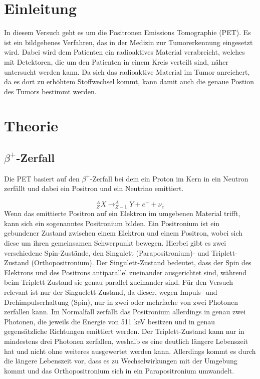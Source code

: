 \section{Einleitung}
In diesem Versuch geht es um die Positronen Emissions Tomographie (PET). Es ist ein bildgebenes Verfahren, das in der Medizin zur Tumorerkennung eingesetzt wird. Dabei wird dem Patienten ein radioaktives Material verabreicht, welches mit Detektoren, die um den Patienten in einem Kreis verteilt sind, näher untersucht werden kann. Da sich das radioaktive Material im Tumor anreichert, da es dort zu erhöhtem Stoffwechsel kommt, kann damit auch die genaue Postion des Tumors bestimmt werden.

\section{Theorie}
\subsection{$\beta^{+}$-Zerfall}
Die PET basiert auf den $\beta^{+}$-Zerfall bei dem ein Proton im Kern in ein Neutron zerfällt und dabei ein Positron und ein Neutrino emittiert.

\begin{equation}
	^{A}_{Z}X \rightarrow ^{A}_{Z-1}Y + e^{+} + \nu_{e}
\end{equation}
Wenn das emittierte Positron auf ein Elektron im umgebenen Material trifft, kann sich ein sogenanntes Positronium bilden. Ein Positronium ist ein gebundener Zustand zwischen einem Elektron und einem Positron, wobei sich diese um ihren gemeinsamen Schwerpunkt bewegen. Hierbei gibt es zwei verschiedene Spin-Zustände, den Singulett (Parapositronium)- und Triplett-Zustand (Orthopositronium). Der Singulett-Zustand bedeutet, dass der Spin des Elektrons und des Positrons antiparallel zueinander ausgerichtet sind, während beim Triplett-Zustand sie genau parallel zueinander sind. Für den Versuch relevant ist nur der Singuelett-Zustand, da dieser, wegen Impuls- und Drehimpulserhaltung (Spin), nur in zwei oder mehrfache von zwei Photonen zerfallen kann. Im Normalfall zerfällt das Positronium allerdings in genau zwei Photonen, die jeweils die Energie von 511 keV besitzen und in genau gegensätzliche Richtungen emittiert werden. Der Triplett-Zustand kann nur in mindestens drei Photonen zerfallen, weshalb es eine deutlich längere Lebenszeit hat und nicht ohne weiteres ausgewertet werden kann. Allerdings kommt es durch die längere Lebenszeit vor, dass es zu Wechselwirkungen mit der Umgebung kommt und das Orthopositronium sich in ein Parapositronium umwandelt.

